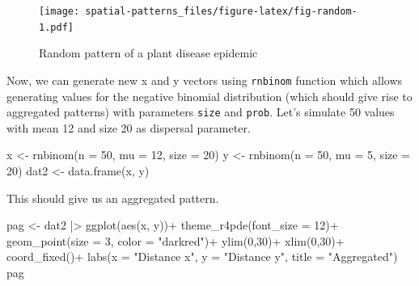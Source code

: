 \documentclass[
  letterpaper,
]{book}
\newenvironment{Shaded}{\begin{snugshade}}{\end{snugshade}}
\newcommand{\AttributeTok}[1]{\textcolor[rgb]{0.40,0.45,0.13}{#1}}
\newcommand{\DecValTok}[1]{\textcolor[rgb]{0.68,0.00,0.00}{#1}}
\newcommand{\FunctionTok}[1]{\textcolor[rgb]{0.28,0.35,0.67}{#1}}
\newcommand{\NormalTok}[1]{\textcolor[rgb]{0.00,0.23,0.31}{#1}}
\newcommand{\OtherTok}[1]{\textcolor[rgb]{0.00,0.23,0.31}{#1}}
\newcommand{\SpecialCharTok}[1]{\textcolor[rgb]{0.37,0.37,0.37}{#1}}
\newcommand{\StringTok}[1]{\textcolor[rgb]{0.13,0.47,0.30}{#1}}
\begin{document}
\begin{figure}

\texttt{[image: spatial-patterns\_files/figure-latex/fig-random-1.pdf]} \hfill{}

\caption{\label{fig-random}Random pattern of a plant disease epidemic}

\end{figure}

Now, we can generate new x and y vectors using \texttt{rnbinom} function
which allows generating values for the negative binomial distribution
(which should give rise to aggregated patterns) with parameters
\texttt{size} and \texttt{prob}. Let's simulate 50 values with mean 12
and size 20 as dispersal parameter.

\begin{Shaded}
\begin{Highlighting}[]
\NormalTok{x }\OtherTok{\textless{}{-}} \FunctionTok{rnbinom}\NormalTok{(}\AttributeTok{n =} \DecValTok{50}\NormalTok{, }\AttributeTok{mu =} \DecValTok{12}\NormalTok{, }\AttributeTok{size =} \DecValTok{20}\NormalTok{)}
\NormalTok{y }\OtherTok{\textless{}{-}} \FunctionTok{rnbinom}\NormalTok{(}\AttributeTok{n =} \DecValTok{50}\NormalTok{, }\AttributeTok{mu =} \DecValTok{5}\NormalTok{, }\AttributeTok{size =} \DecValTok{20}\NormalTok{)}
\NormalTok{dat2 }\OtherTok{\textless{}{-}} \FunctionTok{data.frame}\NormalTok{(x, y)}
\end{Highlighting}
\end{Shaded}

This should give us an aggregated pattern.

\begin{Shaded}
\begin{Highlighting}[]
\NormalTok{pag }\OtherTok{\textless{}{-}}\NormalTok{ dat2 }\SpecialCharTok{|\textgreater{}}
  \FunctionTok{ggplot}\NormalTok{(}\FunctionTok{aes}\NormalTok{(x, y))}\SpecialCharTok{+}
  \FunctionTok{theme\_r4pde}\NormalTok{(}\AttributeTok{font\_size =} \DecValTok{12}\NormalTok{)}\SpecialCharTok{+}
  \FunctionTok{geom\_point}\NormalTok{(}\AttributeTok{size =} \DecValTok{3}\NormalTok{, }\AttributeTok{color =} \StringTok{"darkred"}\NormalTok{)}\SpecialCharTok{+}
  \FunctionTok{ylim}\NormalTok{(}\DecValTok{0}\NormalTok{,}\DecValTok{30}\NormalTok{)}\SpecialCharTok{+}
  \FunctionTok{xlim}\NormalTok{(}\DecValTok{0}\NormalTok{,}\DecValTok{30}\NormalTok{)}\SpecialCharTok{+}
  \FunctionTok{coord\_fixed}\NormalTok{()}\SpecialCharTok{+}
  \FunctionTok{labs}\NormalTok{(}\AttributeTok{x =} \StringTok{"Distance x"}\NormalTok{, }\AttributeTok{y =} \StringTok{"Distance y"}\NormalTok{, }
       \AttributeTok{title =} \StringTok{"Aggregated"}\NormalTok{)}
\NormalTok{pag}
\end{Highlighting}
\end{Shaded}
\end{document}

